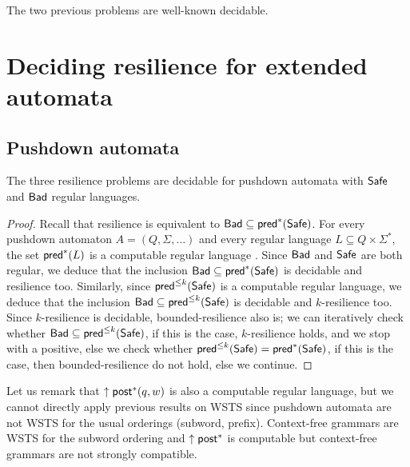 \fi






The two previous problems are well-known decidable.

\section{Deciding resilience for extended automata}


\subsection{Pushdown automata}


\begin{theorem}
The three {\sc resilience} problems are decidable for pushdown automata with $\textsf{Safe}$ and $\textsf{Bad}$ regular languages.
\end{theorem}

\begin{proof}
Recall that resilience is equivalent to  $\textsf{Bad} \subseteq \textsf{pred}^*(\textsf{Safe})$. For every pushdown automaton $A=(Q,\Sigma,...)$ and every regular language $L \subseteq Q \times \Sigma^*$, the set $\textsf{pred}^*(L)$ is a computable regular language \cite{DBLP:journals/ipl/BouajjaniEFMRWW00}. Since $\textsf{Bad}$ and $\textsf{Safe}$ are both regular, we deduce that
%
 the inclusion $\textsf{Bad} \subseteq \textsf{pred}^*(\textsf{Safe})$ is decidable and resilience too.
%
Similarly, since $ \textsf{pred}^{\leq k}(\textsf{Safe})$ is a computable regular language,
we deduce 
that the inclusion $\textsf{Bad} \subseteq \textsf{pred}^{\leq k}(\textsf{Safe})$ is decidable and $k$-resilience too.
Since $k$-resilience is decidable, bounded-resilience also is;
we can iteratively check whether $\textsf{Bad} \subseteq \textsf{pred}^{\leq k}(\textsf{Safe})$,
if this is the case, $k$-resilience holds, and we stop with a positive,
else we check whether $ \textsf{pred}^{\leq k}(\textsf{Safe}) =  \textsf{pred}^{*}(\textsf{Safe})$,
if this is the case, then bounded-resilience do not hold,
else we continue.
\end{proof}
%
Let us remark that $\uparrow \textsf{post}^*(q,w)$ is also a computable regular language, but we cannot directly apply previous results on WSTS since pushdown automata are not WSTS for the usual orderings (subword, prefix).
Context-free grammars are WSTS \cite{DBLP:journals/tcs/FinkelS01} for the subword ordering and $\uparrow \textsf{post}^*$ is computable but context-free grammars are not strongly compatible.

